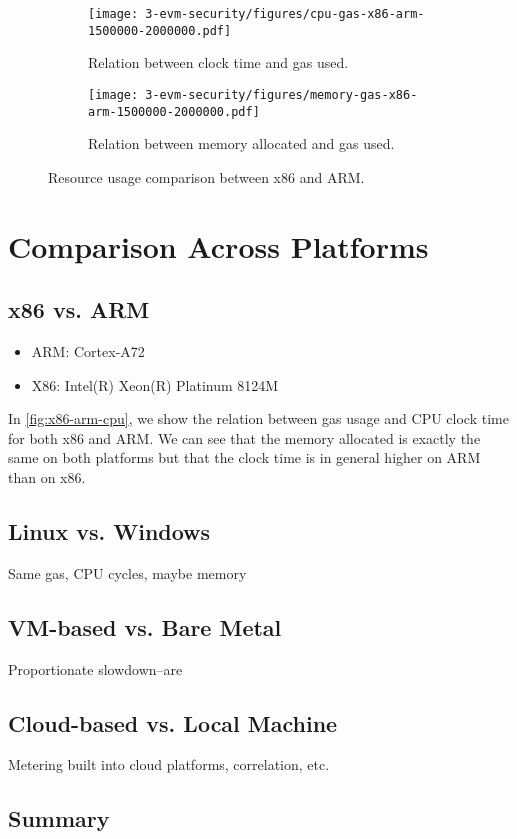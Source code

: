 \begin{figure}[tb]
  \begin{subfigure}{\columnwidth}
    \centering\texttt{[image: 3-evm-security/figures/cpu-gas-x86-arm-1500000-2000000.pdf]}
    \caption{Relation between clock time and gas used.}
    \label{fig:x86-arm-cpu}
  \end{subfigure}

  \begin{subfigure}{\columnwidth}
    \centering\texttt{[image: 3-evm-security/figures/memory-gas-x86-arm-1500000-2000000.pdf]}
    \caption{Relation between memory allocated and gas used.}
    \label{fig:x86-arm-memory}
  \end{subfigure}

  \caption{Resource usage comparison between x86 and ARM.}
  \label{fig:x86-arm}
\end{figure}

\section{Comparison Across Platforms}
\label{sec:cloud}

\subsection{x86 vs. ARM}

\begin{itemize}
\item ARM: Cortex-A72
\item X86: Intel(R) Xeon(R) Platinum 8124M
\end{itemize}

In \autoref{fig:x86-arm-cpu}, we show the relation between gas usage and CPU clock time for both x86 and ARM. We can see that the memory allocated is exactly the same on both platforms but that the clock time is in general higher on ARM than on x86.

\subsection{Linux vs. Windows}
Same gas, CPU cycles, maybe memory

\subsection{VM-based vs. Bare Metal}
Proportionate slowdown--are

\subsection{Cloud-based vs. Local Machine}
Metering built into cloud platforms, correlation, etc.

\subsection{Summary}
